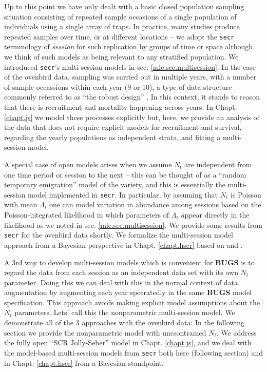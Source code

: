 Up to this point we have only dealt with a basic closed population
sampling situation consisting of repeated sample occasions of a single
population of individuals using a single array of traps. In practice,
many studies produce repeated samples over time, or at different
locations -- we adopt the \mbox{\tt secr} terminology of {\it session}
for such replication by groups of time or space although we think of
such
models as being relevant to any stratified population. We introduced
\mbox{\tt secr}'s
multi-session models in sec. \ref{mle.sec.multisession}.
In the case of the ovenbird data, sampling was carried out
in multiple years, with a number of sample occassions within each year
(9 or 10), a type of data structure commonly referred to as ``the
robust design'' \citep{pollock:1982}.
In this context, it stands to reason that there is
recruitment and mortality happening across years. In
Chapt. \ref{chapt.js} we model these processes explicitly but, here,
we provide an analysis of the data that does not require explicit
models for recruitment and survival, regarding the yearly populations
as independent strata, and fitting a multi-session model.

A special case of open models arises when we assume $N_{t}$ are
independent from one time period or session to the next -- this can be
thought of as a ``random temporary emigration'' model of the
\citet{kendall_etal:1997} variety, and this is essentially the
multi-session model implemented in \mbox{\tt secr}.  In particular, by
assuming that $N_{t}$ is Poisson with mean $\Lambda_{t}$ one can model
variation in abundance among sessions based on the Poisson-integrated
likelihood in which parameters of $\Lambda_{t}$ appear directly in the
likelihood as we noted in sec. \ref{mle.sec.multisession}.  We provide
some results from \mbox{\tt secr} for the ovenbird data shortly.  We
formalize the multi-session model approach from a Bayesian perspective
in Chapt. \ref{chapt.hscr} based on \citet{converse_royle:2012} and
\citet{converse_royle:2013}.

A 3rd way to develop multi-session models which is convenient for {\bf
  BUGS} is to regard the data from each session as an independent data
set with its own $N_{t}$ parameter. Doing this we can deal with this
in the normal context of data augmentation by augmenting each year
speeratedly in the same {\bf BUGS} model specification. This approach
avoids making explicit model assumptions about the $N_{t}$
parameters. Lets' call this the nonparametric multi-session model.  We
demonstrate all of the 3 approaches with the ovenbird data: In the
following section we provide the nonparametric model with
uncsontrained $N_{t}$. We address the fully open ``SCR Jolly-Seber''
model in Chapt. \ref{chapt.js}, and we deal with the model-based
multi-session models from \mbox{\tt secr} both here (following section) and in
Chapt. \ref{chapt.hscr} from a Bayesian standpoint.


